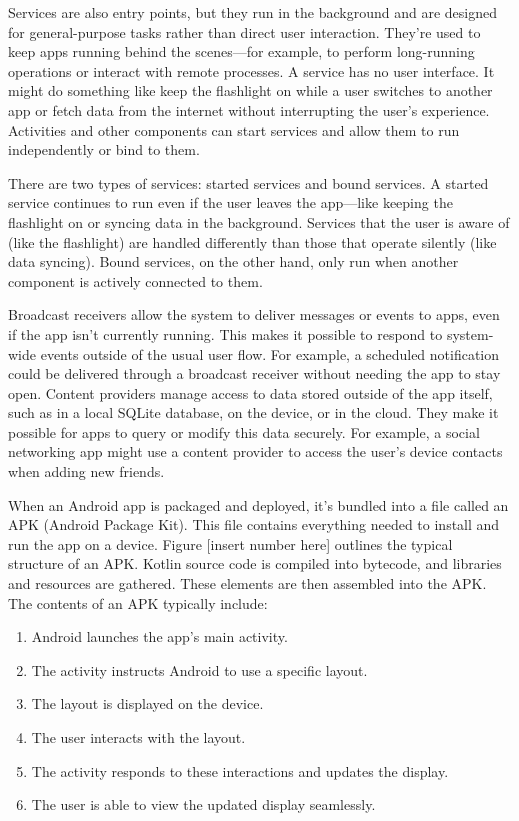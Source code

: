 Services are also entry points, but they run in the background and are designed for general-purpose tasks rather than direct user interaction. They’re used to keep apps running behind the scenes—for example, to perform long-running operations or interact with remote processes. A service has no user interface. It might do something like keep the flashlight on while a user switches to another app or fetch data from the internet without interrupting the user’s experience. Activities and other components can start services and allow them to run independently or bind to them.

There are two types of services: started services and bound services. A started service continues to run even if the user leaves the app—like keeping the flashlight on or syncing data in the background. Services that the user is aware of (like the flashlight) are handled differently than those that operate silently (like data syncing). Bound services, on the other hand, only run when another component is actively connected to them.

Broadcast receivers allow the system to deliver messages or events to apps, even if the app isn't currently running. This makes it possible to respond to system-wide events outside of the usual user flow. For example, a scheduled notification could be delivered through a broadcast receiver without needing the app to stay open.
Content providers manage access to data stored outside of the app itself, such as in a local SQLite database, on the device, or in the cloud. They make it possible for apps to query or modify this data securely. For example, a social networking app might use a content provider to access the user’s device contacts when adding new friends.

When an Android app is packaged and deployed, it’s bundled into a file called an APK (Android Package Kit). This file contains everything needed to install and run the app on a device. Figure [insert number here] outlines the typical structure of an APK.
Kotlin source code is compiled into bytecode, and libraries and resources are gathered. These elements are then assembled into the APK. The contents of an APK typically include:
\begin{enumerate}
	\item Android launches the app’s main activity.
	\item The activity instructs Android to use a specific layout.
	\item The layout is displayed on the device.
	\item The user interacts with the layout.
	\item The activity responds to these interactions and updates the display.
	\item The user is able to view the updated display seamlessly.
\end{enumerate}


